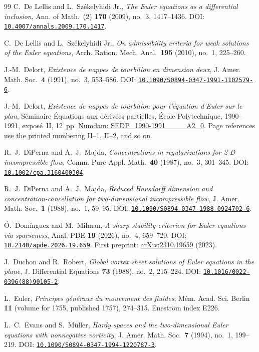 \documentclass[11pt,a4paper,reqno]{amsart}
\theoremstyle{plain}
\theoremstyle{definition}
\theoremstyle{remark}
\numberwithin{equation}{section}
\newcommand{\doi}[1]{\href{https://doi.org/#1}{\nolinkurl{#1}}}
\begin{document}
\begin{thebibliography}{99}
C.~De Lellis and L.~Sz\'ekelyhidi Jr.,
\emph{The Euler equations as a differential inclusion},
Ann. of Math.\ (2) \textbf{170} (2009), no.~3, 1417--1436.
DOI: \doi{10.4007/annals.2009.170.1417}.

C.~De Lellis and L.~Sz\'ekelyhidi Jr.,
\emph{On admissibility criteria for weak solutions of the Euler equations},
Arch. Ration. Mech. Anal.\ \textbf{195} (2010), no.~1, 225--260.

J.-M.~Delort,
\emph{Existence de nappes de tourbillon en dimension deux},
J. Amer. Math. Soc.\ \textbf{4} (1991), no.~3, 553--586.
DOI: \doi{10.1090/S0894-0347-1991-1102579-6}.

J.-M.~Delort,
\emph{Existence de nappes de tourbillon pour l'\'equation d'Euler sur le plan},
S\'eminaire \mbox{\'Equations} aux d\'eriv\'ees partielles,
\'Ecole Polytechnique, 1990--1991, expos\'e~II, 12~pp.
\href{https://www.numdam.org/item/SEDP_1990-1991____A2_0/}{Numdam: SEDP\_1990-1991\_\_\_\_A2\_0}.
Page references use the printed numbering II--1, II--2, and so on.

R.~J.~DiPerna and A.~J.~Majda,
\emph{Concentrations in regularizations for 2-D incompressible flow},
Comm. Pure Appl. Math.\ \textbf{40} (1987), no.~3, 301--345.
DOI: \doi{10.1002/cpa.3160400304}.

R.~J.~DiPerna and A.~J.~Majda,
\emph{Reduced Hausdorff dimension and concentration-cancellation for two-dimensional incompressible flow},
J. Amer. Math. Soc.\ \textbf{1} (1988), no.~1, 59--95.
DOI: \doi{10.1090/S0894-0347-1988-0924702-6}.

\'O.~Dom\'inguez and M.~Milman,
\emph{A sharp stability criterion for Euler equations via sparseness},
Anal. PDE \textbf{19} (2026), no.~4, 659--720.
DOI: \doi{10.2140/apde.2026.19.659}.
First preprint: \href{https://arxiv.org/abs/2310.19659}{arXiv:2310.19659} (2023).

J.~Duchon and R.~Robert,
\emph{Global vortex sheet solutions of Euler equations in the plane},
J. Differential Equations \textbf{73} (1988), no.~2, 215--224.
DOI: \doi{10.1016/0022-0396(88)90105-2}.

L.~Euler,
\emph{Principes g\'en\'eraux du mouvement des fluides},
M\'em. Acad. Sci. Berlin \textbf{11} (volume for 1755, published 1757), 274--315.
Enestr\"om index E226.

L.~C.~Evans and S.~M\"uller,
\emph{Hardy spaces and the two-dimensional Euler equations with nonnegative vorticity},
J. Amer. Math. Soc.\ \textbf{7} (1994), no.~1, 199--219.
DOI: \doi{10.1090/S0894-0347-1994-1220787-3}.


\end{thebibliography}
\end{document}
